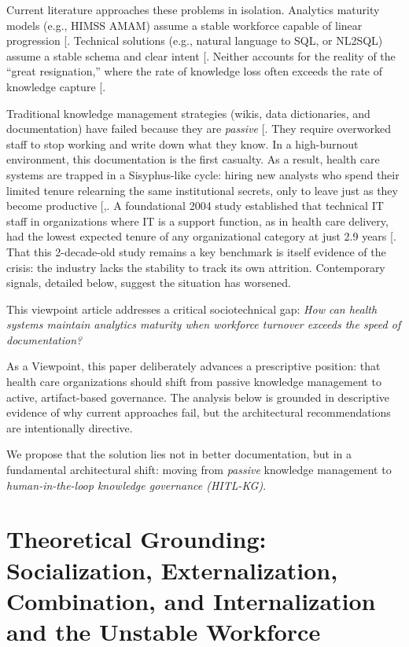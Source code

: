 \documentclass[
  american,
  11pt,
  letterpaper,
  oneside  ,captions=tableheading
]{scrartcl}
\begin{document}
Current literature approaches these problems in isolation. Analytics
maturity models (e.g., HIMSS AMAM) assume a stable workforce capable of
linear progression {[}\citeproc{ref-himss2024}{1}{]}. Technical
solutions (e.g., natural language to SQL, or NL2SQL) assume a stable
schema and clear intent {[}\citeproc{ref-wang2020}{15}{]}. Neither
accounts for the reality of the ``great resignation,'' where the rate of
knowledge loss often exceeds the rate of knowledge capture
{[}\citeproc{ref-rao2006}{13}{]}.

Traditional knowledge management strategies (wikis, data dictionaries,
and documentation) have failed because they are \emph{passive}
{[}\citeproc{ref-mayo2016}{16}{]}. They require overworked staff to stop
working and write down what they know. In a high-burnout environment,
this documentation is the first casualty. As a result, health care
systems are trapped in a Sisyphus-like cycle: hiring new analysts who
spend their limited tenure relearning the same institutional secrets,
only to leave just as they become productive
{[},\citeproc{ref-mantas2010}{18}{]}. A
foundational 2004 study established that technical IT staff in
organizations where IT is a support function, as in health care
delivery, had the lowest expected tenure of any organizational category
at just 2.9 years {[}\citeproc{ref-ang2004}{19}{]}. That this
2-decade-old study remains a key benchmark is itself evidence of the
crisis: the industry lacks the stability to track its own attrition.
Contemporary signals, detailed below, suggest the situation has
worsened.

This viewpoint article addresses a critical sociotechnical gap:
\emph{How can health systems maintain analytics maturity when workforce
turnover exceeds the speed of documentation?}

As a Viewpoint, this paper deliberately advances a prescriptive
position: that health care organizations should shift from passive
knowledge management to active, artifact-based governance. The analysis
below is grounded in descriptive evidence of why current approaches
fail, but the architectural recommendations are intentionally directive.

We propose that the solution lies not in better documentation, but in a
fundamental architectural shift: moving from \emph{passive} knowledge
management to \emph{human-in-the-loop knowledge governance (HITL-KG)}.

\section{Theoretical Grounding: Socialization, Externalization,
Combination, and Internalization and the Unstable
Workforce}\label{theoretical-grounding-socialization-externalization-combination-and-internalization-and-the-unstable-workforce}
\end{document}
